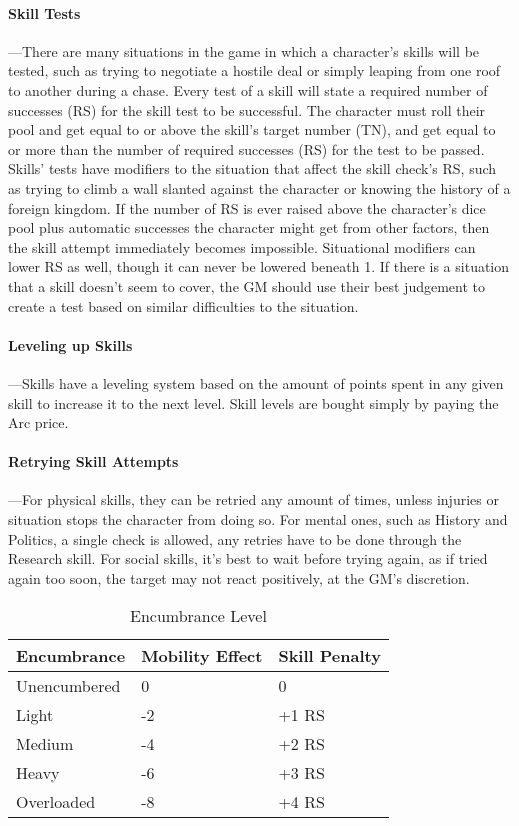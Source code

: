 \documentclass[oneside,11pt,english]{book}
\begin{document}
\paragraph{\label{par:Skill Tests}Skill Tests}
---\quad There are many situations in the game in which a character’s skills will be tested, such as trying to negotiate a hostile deal or simply leaping from one roof to another during a chase. Every test of a skill will state a required number of successes (RS) for the skill test to be successful. The character must roll their pool and get equal to or above the skill’s target number (TN), and get equal to or more than the number of required successes (RS) for the test to be passed. Skills’ tests have modifiers to the situation that affect the skill check’s RS, such as trying to climb a wall slanted against the character or knowing the history of a foreign kingdom. If the number of RS is ever raised above the character’s dice pool plus automatic successes the character might get from other factors, then the skill attempt immediately becomes impossible. Situational modifiers can lower RS as well, though it can never be lowered beneath 1. If there is a situation that a skill doesn’t seem to cover, the GM should use their best judgement to create a test based on similar difficulties to the situation.

\paragraph{Leveling up Skills} 
---\quad Skills have a leveling system based on the amount of points spent in any given skill to increase it to the next level. Skill levels are bought simply by paying the Arc price.
\paragraph{Retrying Skill Attempts}
---\quad For physical skills, they can be retried any amount of times, unless injuries or situation stops the character from doing so. For mental ones, such as History and Politics, a single check is allowed, any retries have to be done through the Research skill. For social skills, it’s best to wait before trying again, as if tried again too soon, the target may not react positively, at the GM’s discretion.

\setlength{\intextsep}{0pt}
\vspace{-5pt}\begin{wraptable}{r}{8 cm}
	\centering
	\caption{Encumbrance Level}
	\label{tab:Encumbrance Penalties}
	\begin{tabu} spread 0pt{XX[c]X[r]}
		Encumbrance		&Mobility Effect&Skill Penalty\\\toprule
		Unencumbered	&0				&0\\
		Light			&-2				&+1 RS\\
		Medium			&-4				&+2 RS\\
		Heavy			&-6				&+3 RS\\
		Overloaded		&-8				&+4 RS\\
	\end{tabu}
\end{wraptable}
\setlength{\intextsep}{\oldintextsep}
\end{document}
